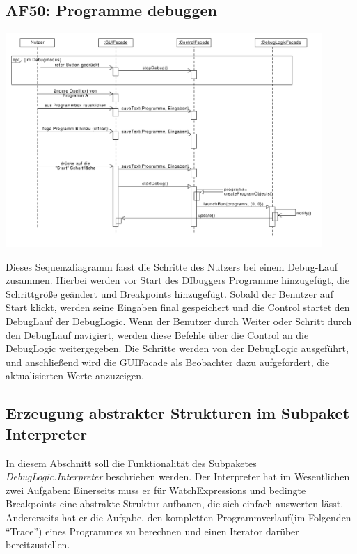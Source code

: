 \documentclass[parskip=full]{scrartcl}
\begin{document}
\subsection{AF50: Programme debuggen}
\begin{center}
\includegraphics[width=0.9\textwidth]{diagrammIdeenUmlet/SequenceDiagrams/seq_AF50PDF.pdf}
\end{center}
Dieses Sequenzdiagramm fasst die Schritte des Nutzers bei einem Debug-Lauf zusammen.
Hierbei werden vor Start des DIbuggers Programme hinzugefügt, die Schrittgröße geändert und Breakpoints hinzugefügt.
Sobald der Benutzer auf Start klickt, werden seine Eingaben final gespeichert und die Control startet 
den DebugLauf der DebugLogic.
Wenn der Benutzer durch Weiter oder Schritt durch den DebugLauf navigiert, werden diese Befehle über
die Control an die DebugLogic weitergegeben. Die Schritte werden von der DebugLogic ausgeführt, und anschließend
wird die GUIFacade als Beobachter dazu aufgefordert, die aktualisierten Werte anzuzeigen.
\subsection{Erzeugung abstrakter Strukturen im Subpaket Interpreter}
In diesem Abschnitt soll die Funktionalität des Subpaketes \textit{DebugLogic.Interpreter} beschrieben werden. Der Interpreter hat im Wesentlichen zwei Aufgaben: Einerseits muss er für WatchExpressions und bedingte Breakpoints eine abstrakte Struktur aufbauen, die sich einfach auswerten lässt. Andererseits hat er die Aufgabe, den kompletten Programmverlauf(im Folgenden \enquote{Trace})  eines Programmes zu berechnen und einen Iterator darüber bereitzustellen.
\end{document}
